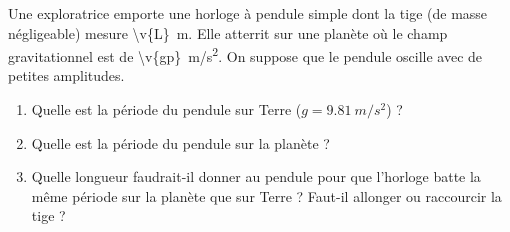 Une exploratrice emporte une horloge à pendule simple dont la tige (de masse négligeable) mesure \qty{\v{L}}{m}. Elle atterrit sur une planète où le champ gravitationnel est de \qty{\v{gp}}{m/s^2}. On suppose que le pendule oscille avec de petites amplitudes.

\begin{enumerate}[label=\alph*)]
    \item Quelle est la période du pendule sur Terre ($g = \qty{9.81}{m/s^2}$) ?
    \item Quelle est la période du pendule sur la planète ?
    \item Quelle longueur faudrait-il donner au pendule pour que l'horloge batte la même période sur la planète que sur Terre ? Faut-il allonger ou raccourcir la tige ?
\end{enumerate}
